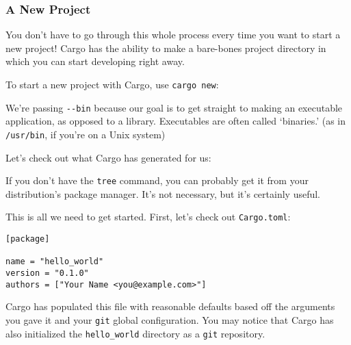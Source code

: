 \documentclass[a4paper,]{book}
\newenvironment{Shaded}{\begin{snugshade}}{\end{snugshade}}
\newcommand{\KeywordTok}[1]{\textcolor[rgb]{0.13,0.29,0.53}{\textbf{{#1}}}}
\newcommand{\NormalTok}[1]{{#1}}
\begin{document}
\subsubsection{A New Project}\label{a-new-project}

You don't have to go through this whole process every time you want to
start a new project! Cargo has the ability to make a bare-bones project
directory in which you can start developing right away.

To start a new project with Cargo, use \texttt{cargo\ new}:

\begin{Shaded}
\end{Shaded}

We're passing \texttt{-\/-bin} because our goal is to get straight to
making an executable application, as opposed to a library. Executables
are often called `binaries.' (as in \texttt{/usr/bin}, if you're on a
Unix system)

Let's check out what Cargo has generated for us:

\begin{Shaded}
\end{Shaded}

If you don't have the \texttt{tree} command, you can probably get it
from your distribution's package manager. It's not necessary, but it's
certainly useful.

This is all we need to get started. First, let's check out
\texttt{Cargo.toml}:

\begin{verbatim}
[package]

name = "hello_world"
version = "0.1.0"
authors = ["Your Name <you@example.com>"]
\end{verbatim}

Cargo has populated this file with reasonable defaults based off the
arguments you gave it and your \texttt{git} global configuration. You
may notice that Cargo has also initialized the \texttt{hello\_world}
directory as a \texttt{git} repository.
\end{document}
